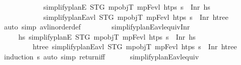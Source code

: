 \begin{isabellebody}
\ \ \ \ \ \ \ \ \ \ \ \ {\isacartoucheopen}simplify{\isacharunderscore}{\kern0pt}planE\ STG\ mp{\isacharunderscore}{\kern0pt}objT\ mp{\isacharunderscore}{\kern0pt}Fevl\ htps\ {\isasympi}s\ {\isacharequal}{\kern0pt}\ Inr\ hs{\isacharprime}{\kern0pt}{\isacartoucheclose}\isanewline
\ \ \ \ \ \ \ \ \ \ \ \ {\isacartoucheopen}simplify{\isacharunderscore}{\kern0pt}planE{\isacharunderscore}{\kern0pt}avl{\isacharprime}{\kern0pt}\ STG\ mp{\isacharunderscore}{\kern0pt}objT\ mp{\isacharunderscore}{\kern0pt}Fevl\ htps\ {\isasympi}s\ {\isacharequal}{\kern0pt}\ Inr\ htree{\isacharprime}{\kern0pt}{\isacartoucheclose}\isanewline
\ \ \ \ \ \ \isamarkupfalse%
\ {\isacharparenleft}{\kern0pt}auto\ simp{\isacharcolon}{\kern0pt}\ avl{\isacharunderscore}{\kern0pt}inorder{\isacharunderscore}{\kern0pt}def{\isacharparenright}{\kern0pt}\isanewline
\ \ \isamarkupfalse%
%
\endisatagproof
{\isafoldproof}%
%
\isadelimproof
\ \isanewline
%
\endisadelimproof
\isanewline
\ \ \isamarkupfalse%
\ simplify{\isacharunderscore}{\kern0pt}planE{\isacharunderscore}{\kern0pt}avl{\isacharunderscore}{\kern0pt}equiv{\isacharunderscore}{\kern0pt}Inr{\isacharcolon}{\kern0pt}\ \isanewline
\ \ \ \ \ {\isachardoublequoteopen}{\isacharparenleft}{\kern0pt}{\isasymexists}hs{\isachardot}{\kern0pt}\ simplify{\isacharunderscore}{\kern0pt}planE\ STG\ mp{\isacharunderscore}{\kern0pt}objT\ mp{\isacharunderscore}{\kern0pt}Fevl\ htps\ {\isasympi}s\ {\isacharequal}{\kern0pt}\ Inr\ hs{\isacharparenright}{\kern0pt}\ \isanewline
\ \ \ \ \ \ \ \ {\isasymlongleftrightarrow}\ {\isacharparenleft}{\kern0pt}{\isasymexists}htree{\isachardot}{\kern0pt}\ simplify{\isacharunderscore}{\kern0pt}planE{\isacharunderscore}{\kern0pt}avl{\isacharprime}{\kern0pt}\ STG\ mp{\isacharunderscore}{\kern0pt}objT\ mp{\isacharunderscore}{\kern0pt}Fevl\ htps\ {\isasympi}s\ {\isacharequal}{\kern0pt}\ Inr\ htree{\isacharparenright}{\kern0pt}{\isachardoublequoteclose}\isanewline
%
\isadelimproof
\ \ \ \ %
\endisadelimproof
%
\isatagproof
{}\isamarkupfalse%
\ {\isacharparenleft}{\kern0pt}induction\ {\isasympi}s{\isacharparenright}{\kern0pt}\ {\isacharparenleft}{\kern0pt}auto\ simp{\isacharcolon}{\kern0pt}\ return{\isacharunderscore}{\kern0pt}iff{\isacharparenright}{\kern0pt}%
\endisatagproof
{\isafoldproof}%
%
\isadelimproof
\isanewline
%
\endisadelimproof
\isanewline
\ \ \isanewline
\ \ \isamarkupfalse%
\ simplify{\isacharunderscore}{\kern0pt}planE{\isacharunderscore}{\kern0pt}avl{\isacharunderscore}{\kern0pt}equiv{\isacharcolon}{\kern0pt}\ \isanewline

\end{isabellebody}

